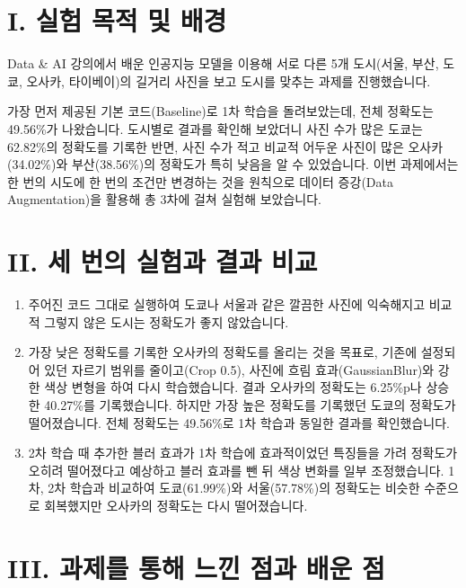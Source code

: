 \documentclass[11pt]{article}
\begin{document}
\makeheader

\section*{I. 실험 목적 및 배경}

Data \& AI 강의에서 배운 인공지능 모델을 이용해 서로 다른 5개 도시(서울, 부산, 도쿄, 오사카, 타이베이)의 길거리 사진을 보고 도시를 맞추는 과제를 진행했습니다.

가장 먼저 제공된 기본 코드(Baseline)로 1차 학습을 돌려보았는데, 전체 정확도는 49.56\%가 나왔습니다. 도시별로 결과를 확인해 보았더니 사진 수가 많은 도쿄는 62.82\%의 정확도를 기록한 반면, 사진 수가 적고 비교적 어두운 사진이 많은 오사카(34.02\%)와 부산(38.56\%)의 정확도가 특히 낮음을 알 수 있었습니다. 이번 과제에서는 한 번의 시도에 한 번의 조건만 변경하는 것을 원칙으로 데이터 증강(Data Augmentation)을 활용해 총 3차에 걸쳐 실험해 보았습니다.

\section*{II. 세 번의 실험과 결과 비교}

\begin{enumerate}[label=\arabic* 서비스 학습:, leftmargin=1.5em]
  \item[\bfseries ① 1차 학습 :] 주어진 코드 그대로 실행하여 도쿄나 서울과 같은 깔끔한 사진에 익숙해지고 비교적 그렇지 않은 도시는 정확도가 좋지 않았습니다.
  \item[\bfseries ② 2차 학습 :] 가장 낮은 정확도를 기록한 오사카의 정확도를 올리는 것을 목표로, 기존에 설정되어 있던 자르기 범위를 줄이고(Crop 0.5), 사진에 흐림 효과(GaussianBlur)와 강한 색상 변형을 하여 다시 학습했습니다. 결과 오사카의 정확도는 6.25\%p나 상승한 40.27\%를 기록했습니다. 하지만 가장 높은 정확도를 기록했던 도쿄의 정확도가 떨어졌습니다. 전체 정확도는 49.56\%로 1차 학습과 동일한 결과를 확인했습니다.
  \item[\bfseries ③ 3차 학습 :] 2차 학습 때 추가한 블러 효과가 1차 학습에 효과적이었던 특징들을 가려 정확도가 오히려 떨어졌다고 예상하고 블러 효과를 뺀 뒤 색상 변화를 일부 조정했습니다. 1차, 2차 학습과 비교하여 도쿄(61.99\%)와 서울(57.78\%)의 정확도는 비슷한 수준으로 회복했지만 오사카의 정확도는 다시 떨어졌습니다.
\end{enumerate}

\section*{III. 과제를 통해 느낀 점과 배운 점}
\end{document}
